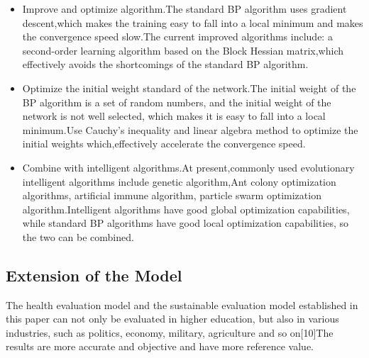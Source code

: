 \documentclass[12pt]{article}  %
\begin{document}
\begin{itemize}
    \item Improve and optimize algorithm.The standard BP algorithm uses gradient descent,which makes the training easy to fall into a local minimum and makes the convergence speed slow.The current improved algorithms include: a second-order learning algorithm based on the Block Hessian matrix,which effectively avoids the shortcomings of the standard BP algorithm.
    \item Optimize the initial weight standard of the network.The initial weight of the BP algorithm is a set of random numbers, and the initial weight of the network is not well selected, which makes it is easy to fall into a local minimum.Use Cauchy's inequality and linear algebra method to optimize the initial weights which,effectively accelerate the convergence speed.
    \item Combine with intelligent algorithms.At present,commonly used evolutionary intelligent algorithms include genetic algorithm,Ant colony optimization algorithms, artificial immune algorithm, particle swarm optimization algorithm.Intelligent algorithms have good global optimization capabilities, while standard BP algorithms have good local optimization capabilities, so the two can be combined.

\end{itemize}
\subsection{Extension of the Model}
The health evaluation model and the sustainable evaluation model established in this paper can not only be evaluated in higher education, but also in various industries, such as politics, economy, military, agriculture and so on[10]The results are more accurate and objective and have more reference value.

\vfill
\end{document}
